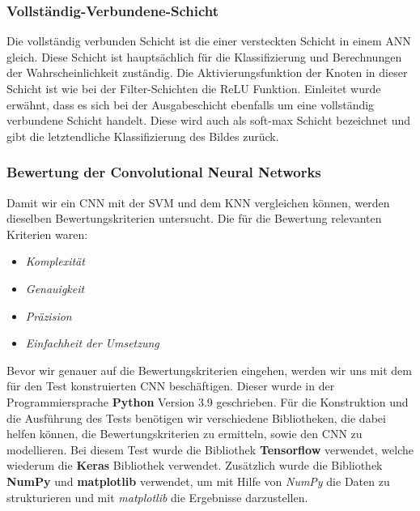 \subsubsection{Vollständig-Verbundene-Schicht}

Die vollständig verbunden Schicht ist die einer versteckten Schicht in einem ANN gleich. Diese Schicht ist hauptsächlich für die Klassifizierung und Berechnungen der Wahrscheinlichkeit zuständig. Die Aktivierungsfunktion der Knoten in dieser Schicht ist wie bei der Filter-Schichten die ReLU Funktion.
Einleitet wurde erwähnt, dass es sich bei der Ausgabeschicht ebenfalls um eine vollständig verbundene Schicht handelt. Diese wird auch als soft-max Schicht bezeichnet und gibt die letztendliche Klassifizierung des Bildes zurück.\cite*{Sewak2018}

\subsubsection{Bewertung der Convolutional Neural Networks}

Damit wir ein CNN mit der SVM und dem KNN vergleichen können, werden dieselben Bewertungskriterien untersucht. Die für die Bewertung relevanten Kriterien waren:

\begin{itemize}
\item \textit{Komplexität}
\item \textit{Genauigkeit}
\item \textit{Präzision}
\item \textit{Einfachheit der Umsetzung}
\end{itemize}

Bevor wir genauer auf die Bewertungskriterien eingehen, werden wir uns mit dem für den Test konstruierten CNN beschäftigen.
Dieser wurde in der Programmiersprache \textbf{Python} Version 3.9 geschrieben. Für die Konstruktion und die Ausführung des Tests benötigen wir verschiedene Bibliotheken, die dabei helfen können, die Bewertungskriterien zu ermitteln, sowie den CNN zu modellieren. Bei diesem Test wurde die Bibliothek \textbf{Tensorflow} verwendet, welche wiederum die \textbf{Keras} Bibliothek verwendet. Zusätzlich wurde die Bibliothek \textbf{NumPy} und \textbf{matplotlib} verwendet, um mit Hilfe von \textit{NumPy} die Daten zu strukturieren und mit \textit{matplotlib} die Ergebnisse darzustellen.

